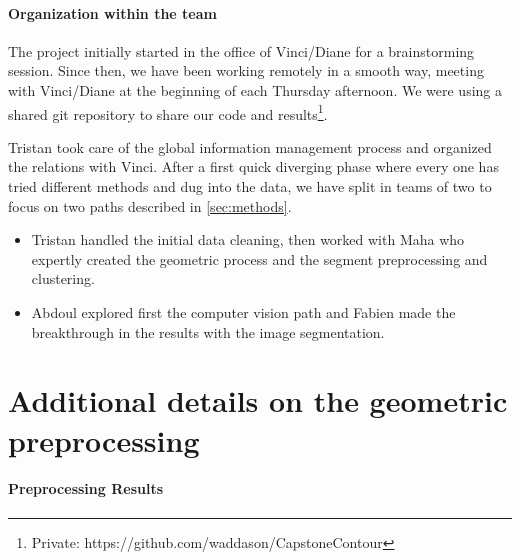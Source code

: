 \documentclass[11pt]{article}
\begin{document}
\paragraph{Organization within the team}
The project initially started in the office of Vinci/Diane for a brainstorming session.
Since then, we have been working remotely in a smooth way, meeting with 
Vinci/Diane at the beginning of each Thursday afternoon. We were using a shared 
git repository to share our code and results\footnote{Private: https://github.com/waddason/CapstoneContour}.

Tristan took care of the global information management process and organized the
relations with Vinci. After a first quick diverging phase where every one has 
tried different methods and dug into the data,  we have split in teams of two 
to focus on two paths described in \cref{sec:methods}. 
\begin{itemize}
    \item Tristan handled the initial data cleaning, then worked with Maha who 
    expertly created the geometric process and the segment preprocessing and clustering.
    \item Abdoul explored first the computer vision path and Fabien made the 
    breakthrough in the results with the image segmentation.
\end{itemize}







\appendix

\newpage

\section{Additional details on the geometric preprocessing}
\label{app:sec:geomdetails}
\paragraph{Preprocessing Results}
\end{document}
